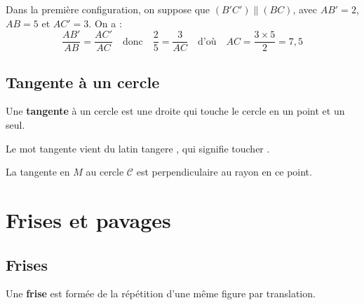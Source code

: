 \begin{ex}
	Dans la première configuration, on suppose que $(B'C') \parallel (BC)$, avec $AB' = 2$, $AB = 5$ et $AC' = 3$. On a :
	\[
		\dfrac{AB'}{AB} = \dfrac{AC'}{AC} \quad\text{donc}\quad \dfrac{2}{5} = \dfrac{3}{AC} \quad\text{d'où}\quad AC = \dfrac{3 \times 5}{2} = 7{,}5
	\]
\end{ex}

\subsection{Tangente à un cercle}

\begin{defin}
	Une \textbf{tangente} à un cercle est une droite qui \og{} touche \fg{} le cercle en un point et un seul.
\end{defin}

\begin{rem}
	Le mot \og{} tangente \fg{} vient du latin \og{} tangere \fg{}, qui signifie \og{} toucher \fg{}.
\end{rem}

\begin{prop}
	La tangente en $M$ au cercle $\mathcal{C}$ est perpendiculaire au rayon en ce point.
\end{prop}

\begin{center}
\end{center}

\section{Frises et pavages}

\subsection{Frises}

\begin{defin}
	Une \textbf{frise} est formée de la répétition d'une même figure par translation.
\end{defin}


